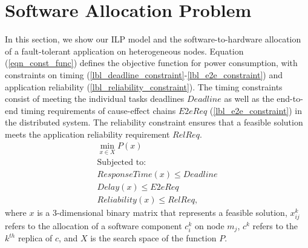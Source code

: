 \section{Software Allocation Problem}\label{sec_allocation}
In this section, we show our ILP model and the software-to-hardware allocation of a fault-tolerant application on heterogeneous nodes. Equation (\ref{eqn_const_func}) defines the objective function for power consumption, with constraints on timing (\ref{lbl_deadline_constraint}-\ref{lbl_e2e_constraint}) and application reliability (\ref{lbl_reliability_constraint}). 
The timing constraints consist of meeting the individual tasks deadlines $Deadline$  as well as the end-to-end timing requirements of cause-effect chains $E2eReq$ (\ref{lbl_e2e_constraint}) in the distributed system. The reliability constraint ensures that a feasible solution meets the application reliability requirement $RelReq$. 
\begin{align}
\label{eqn_const_func}
\min_{x\in X} P(x) \\
\text{Subjected to:}\nonumber\\
\label{lbl_deadline_constraint} 
ResponseTime(x) \leq Deadline\\ 
\label{lbl_e2e_constraint}
Delay(x) \leq E2eReq \\
\label{lbl_reliability_constraint}
Reliability(x) \leq RelReq,
\end{align}
where $x$ is a 3-dimensional binary matrix that represents a feasible solution, $x^k_{ij}$ refers to the allocation of a software component $c^k_i$ on node $m_j$, $c^k$ refers to the $k^{th}$ replica of $c$, and $X$ is the search space of the function $P$. 

